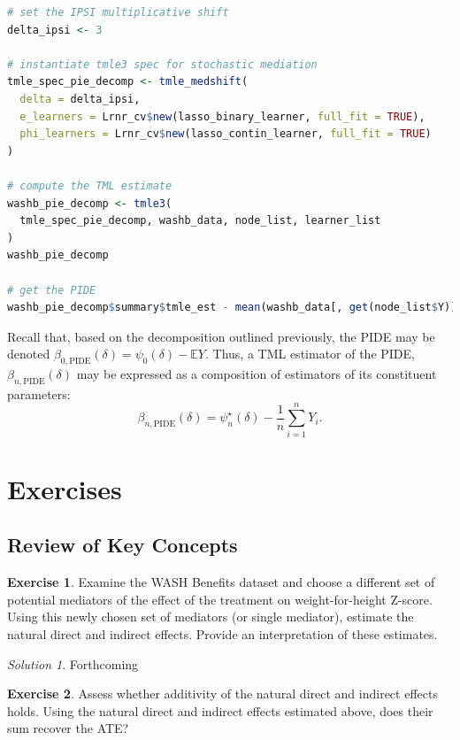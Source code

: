 \documentclass[
  12pt, krantz2,
]{krantz}
\newcommand{\E}{\mathbb{E}}
\newcommand{\1}{\mathbbm{1}}
\theoremstyle{definition}
\theoremstyle{definition}
\theoremstyle{definition}
\newtheorem{exercise}{Exercise}[chapter]
\theoremstyle{definition}
\theoremstyle{remark}
\newtheorem*{solution}{Solution}
\begin{document}
\begin{lstlisting}[language=R]
# set the IPSI multiplicative shift
delta_ipsi <- 3

# instantiate tmle3 spec for stochastic mediation
tmle_spec_pie_decomp <- tmle_medshift(
  delta = delta_ipsi,
  e_learners = Lrnr_cv$new(lasso_binary_learner, full_fit = TRUE),
  phi_learners = Lrnr_cv$new(lasso_contin_learner, full_fit = TRUE)
)

# compute the TML estimate
washb_pie_decomp <- tmle3(
  tmle_spec_pie_decomp, washb_data, node_list, learner_list
)
washb_pie_decomp

# get the PIDE
washb_pie_decomp$summary$tmle_est - mean(washb_data[, get(node_list$Y)])
\end{lstlisting}

Recall that, based on the decomposition outlined previously, the PIDE may be
denoted \(\beta_{0,\text{PIDE}}(\delta) = \psi_0(\delta) - \E Y\). Thus,
a TML estimator of the PIDE, \(\beta_{n,\text{PIDE}}(\delta)\) may be expressed
as a composition of estimators of its constituent parameters:
\begin{equation*}
  \beta_{n,\text{PIDE}}({\delta}) = \psi^{\star}_{n}(\delta) -
  \frac{1}{n} \sum_{i = 1}^n Y_i.
\end{equation*}

\hypertarget{exercises-5}{%
\section{Exercises}\label{exercises-5}}

\hypertarget{review-of-key-concepts-3}{%
\subsection{Review of Key Concepts}\label{review-of-key-concepts-3}}

\begin{exercise}
Examine the WASH Benefits dataset and choose a different set of potential
mediators of the effect of the treatment on weight-for-height Z-score. Using
this newly chosen set of mediators (or single mediator), estimate the natural
direct and indirect effects. Provide an interpretation of these estimates.
\end{exercise}

\begin{solution}
Forthcoming
\end{solution}

\begin{exercise}
Assess whether additivity of the natural direct and indirect effects holds.
Using the natural direct and indirect effects estimated above, does their sum
recover the ATE?
\end{exercise}
\end{document}
